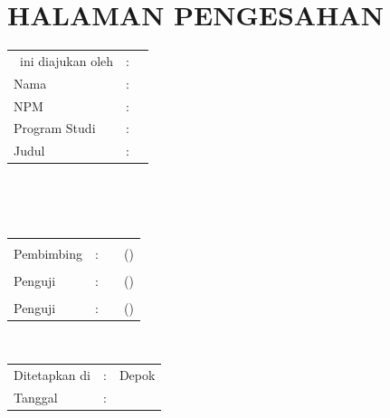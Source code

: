 \chapter*{HALAMAN PENGESAHAN}

\vspace*{0.4cm}
\noindent 

\noindent
\begin{tabular}{ll p{9cm}}
	\type~ini diajukan oleh&: & \\
	Nama&: & \penulis \\
	NPM&: & \npm \\
	Program Studi&: & \program \\
	Judul \type&: & \judul \\
\end{tabular} \\

\vspace*{1.0cm}

\noindent {}\\[0.2cm]

\begin{center}
\end{center}

\vspace*{0.3cm}

\begin{tabular}{l l l l }
	& & & \\
	Pembimbing&: & \pembimbing & (\hspace*{3.0cm}) \\
	& & & \\
	Penguji&: &  & (\hspace*{3.0cm}) \\
	& & & \\
	Penguji&: &  & (\hspace*{3.0cm}) \\
\end{tabular}\\

\vspace*{2.0cm}

\begin{tabular}{ll l}
	Ditetapkan di&: & Depok\\
	Tanggal&: & \tanggalLulus \\
\end{tabular}


